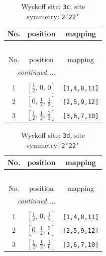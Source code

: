 \documentclass[fleqn,8pt]{jsarticle}
\begin{document}
\renewcommand{\arraystretch}{1.2}
\begin{longtable}{ccc}
\caption{Wyckoff site: {\tt 3c}, site symmetry: {\tt 2'22'}}
 \\
 \hline \hline
No. & position & mapping \\ \hline \endfirsthead

\multicolumn{2}{l}{\tablename\ \thetable{}} \\
 \hline \hline
No. & position & mapping \\ \hline \endhead

 \hline \hline
\multicolumn{2}{r}{\footnotesize\it continued ...} \\ \endfoot

 \hline \hline
\multicolumn{2}{r}{} \\ \endlastfoot

1 & $\left[ \frac{1}{2},\, 0,\, 0 \right]$ & {\tt [1,4,8,11]} \\ \hline
2 & $\left[ 0,\, \frac{1}{2},\, \frac{1}{3} \right]$ & {\tt [2,5,9,12]} \\ \hline
3 & $\left[ \frac{1}{2},\, \frac{1}{2},\, \frac{2}{3} \right]$ & {\tt [3,6,7,10]} \\
\end{longtable}
\renewcommand{\arraystretch}{1.2}
\begin{longtable}{ccc}
\caption{Wyckoff site: {\tt 3d}, site symmetry: {\tt 2'22'}}
 \\
 \hline \hline
No. & position & mapping \\ \hline \endfirsthead

\multicolumn{2}{l}{\tablename\ \thetable{}} \\
 \hline \hline
No. & position & mapping \\ \hline \endhead

 \hline \hline
\multicolumn{2}{r}{\footnotesize\it continued ...} \\ \endfoot

 \hline \hline
\multicolumn{2}{r}{} \\ \endlastfoot

1 & $\left[ \frac{1}{2},\, 0,\, \frac{1}{2} \right]$ & {\tt [1,4,8,11]} \\ \hline
2 & $\left[ 0,\, \frac{1}{2},\, \frac{5}{6} \right]$ & {\tt [2,5,9,12]} \\ \hline
3 & $\left[ \frac{1}{2},\, \frac{1}{2},\, \frac{1}{6} \right]$ & {\tt [3,6,7,10]} \\
\end{longtable}
\renewcommand{\arraystretch}{1.2}
\end{document}
